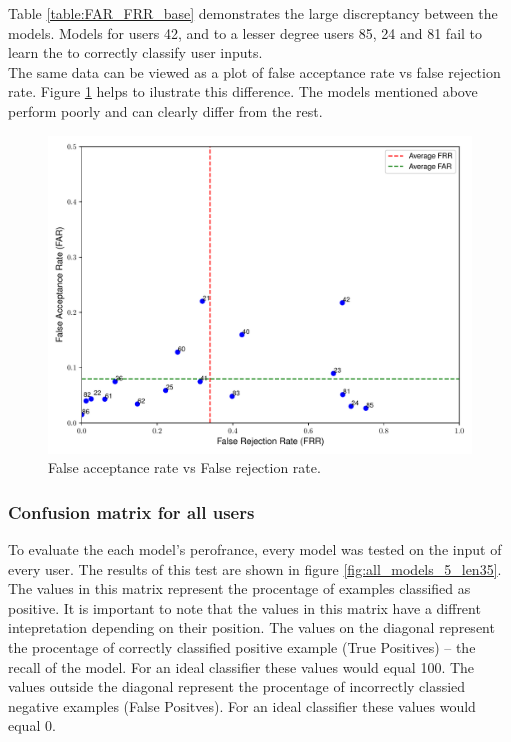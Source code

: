 Table \ref{table:FAR_FRR_base} demonstrates the large discreptancy between the models. Models for users 42, and to a lesser degree users 85, 24 and 81 fail to learn the to correctly classify user inputs. \\
The same data can be viewed as a plot of false acceptance rate vs false rejection rate. 
Figure \ref{fig:frr_vs_far_all_models_base} helps to ilustrate this difference. The models mentioned above perform poorly and can clearly differ from the rest. 

\begin{figure}[H]
	\centering
	
	\includegraphics[width=\textwidth]{images/far_vs_frr.pdf} %
	\caption{False acceptance rate vs False rejection rate.}
	\label{fig:frr_vs_far_all_models_base}
\end{figure}

\subsubsection{Confusion matrix for all users}
To evaluate the each model's perofrance, every model was tested on the input of every user. The results of this test are shown in figure \ref{fig:all_models_5_len35}. The values in this matrix represent the procentage of examples classified as positive. It is important to note that the values in this matrix have a diffrent intepretation depending on their position. The values on the diagonal represent the procentage of correctly classified positive example (True Positives) -- the recall of the model. For an ideal classifier these values would equal 100. The values outside the diagonal represent the procentage of incorrectly classied negative examples (False Positves). For an ideal classifier these values would equal 0.

